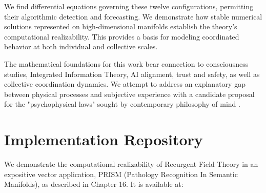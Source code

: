 \documentclass[11pt, a4paper]{report}
\begin{document}
\vspace{1em}

We find differential equations governing these twelve configurations, permitting their algorithmic detection and forecasting. We demonstrate how stable numerical solutions represented on high-dimensional manifolds establish the theory's computational realizability. This provides a basis for modeling coordinated behavior at both individual and collective scales.

\vspace{1em}

The mathematical foundations for this work bear connection to consciousness studies, Integrated Information Theory, AI alignment, trust and safety, as well as collective coordination dynamics. We attempt to address an explanatory gap between physical processes and subjective experience with a candidate proposal for the "psychophysical laws" sought by contemporary philosophy of mind \autocite{Chalmers1996}.

\tableofcontents


















\appendix
\chapter{Implementation Repository}
\label{appendix:implementation}

We demonstrate the computational realizability of Recurgent Field Theory in an expositive vector application, PRISM (Pathology Recognition In Semantic Manifolds), as described in Chapter 16. It is available at:
\end{document}
